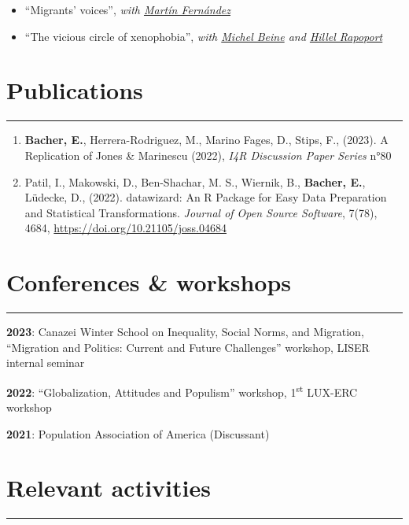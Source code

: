 \documentclass{article}
\newcommand{\sectionline}{%
  \vspace{-0.6cm}%
  \par\noindent\rule{\textwidth}{0.4pt}%
  \vspace{0.3cm}%
}
\let\xsection=\section
\renewcommand{\section}[1]{%
  \vspace{0.4cm}%
  \xsection*{#1}%
  \sectionline%
}
\begin{document}
\begin{itemize}
\item
  ``Migrants' voices'', \emph{with
  \href{https://sites.google.com/view/martinfernandezsanchez/}{Martín
  Fernández}}
\item
  ``The vicious circle of xenophobia'', \emph{with
  \href{https://sites.google.com/site/michelbeineeconomics/home}{Michel
  Beine} and
  \href{https://www.parisschoolofeconomics.eu/en/rapoport-hillel/}{Hillel
  Rapoport}}
\end{itemize}

\section{Publications}

\begin{enumerate}
\def\labelenumi{\arabic{enumi}.}
\item
  \textbf{Bacher, E.}, Herrera-Rodriguez, M., Marino Fages, D., Stips,
  F., (2023). A Replication of Jones \& Marinescu (2022), \emph{I4R
  Discussion Paper Series} n°80
\item
  Patil, I., Makowski, D., Ben-Shachar, M. S., Wiernik, B.,
  \textbf{Bacher, E.}, Lüdecke, D., (2022). datawizard: An R Package for
  Easy Data Preparation and Statistical Transformations. \emph{Journal
  of Open Source Software}, 7(78), 4684,
  \url{https://doi.org/10.21105/joss.04684}
\end{enumerate}

\hypertarget{conferences-workshops}{%
\section{Conferences \& workshops}\label{conferences-workshops}}

\textbf{2023}: Canazei Winter School on Inequality, Social Norms, and
Migration, ``Migration and Politics: Current and Future Challenges''
workshop, LISER internal seminar

\textbf{2022}: ``Globalization, Attitudes and Populism'' workshop,
1\textsuperscript{st} LUX-ERC workshop

\textbf{2021}: Population Association of America (Discussant)

\hypertarget{relevant-activities}{%
\section{Relevant activities}\label{relevant-activities}}
\end{document}
